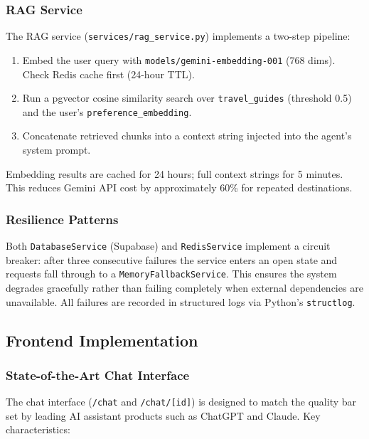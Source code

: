 \documentclass[12pt, a4paper]{article}
\begin{document}
\subsubsection{RAG Service}

The RAG service (\texttt{services/rag\_service.py}) implements a two-step pipeline:

\begin{enumerate}[leftmargin=1.5cm, itemsep=0.3em]
  \item Embed the user query with \texttt{models/gemini-embedding-001} (768 dims). Check Redis cache first (24-hour TTL).
  \item Run a pgvector cosine similarity search over \texttt{travel\_guides} (threshold 0.5) and the user's \texttt{preference\_embedding}.
  \item Concatenate retrieved chunks into a context string injected into the agent's system prompt.
\end{enumerate}

Embedding results are cached for 24 hours; full context strings for 5 minutes. This reduces Gemini API cost by approximately 60\% for repeated destinations.

\subsubsection{Resilience Patterns}

Both \texttt{DatabaseService} (Supabase) and \texttt{RedisService} implement a circuit breaker: after three consecutive failures the service enters an open state and requests fall through to a \texttt{MemoryFallbackService}. This ensures the system degrades gracefully rather than failing completely when external dependencies are unavailable. All failures are recorded in structured logs via Python's \texttt{structlog}.

\subsection{Frontend Implementation}

\subsubsection{State-of-the-Art Chat Interface}

The chat interface (\texttt{/chat} and \texttt{/chat/[id]}) is designed to match the quality bar set by leading AI assistant products such as ChatGPT and Claude. Key characteristics:
\end{document}
